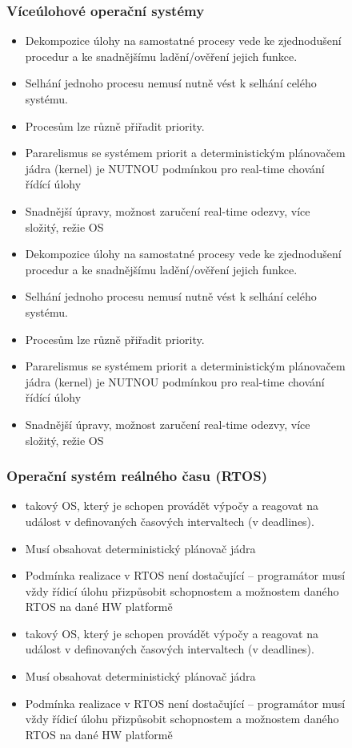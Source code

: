 \begin{figure}[h]
\subsubsection*{Víceúlohové operační systémy}
\begin{itemize}
  \item Dekompozice úlohy na samostatné procesy vede ke zjednodušení procedur a ke snadnějšímu ladění/ověření jejich funkce.
  \item Selhání jednoho procesu nemusí nutně vést k selhání celého systému.
  \item Procesům lze různě přiřadit priority.
  \item Pararelismus se systémem priorit a deterministickým plánovačem jádra (kernel) je NUTNOU podmínkou pro real-time chování řídící úlohy
  \item Snadnější úpravy, možnost zaručení real-time odezvy, více složitý, režie OS
    \item Dekompozice úlohy na samostatné procesy vede ke zjednodušení procedur a ke snadnějšímu ladění/ověření jejich funkce.
    \item Selhání jednoho procesu nemusí nutně vést k selhání celého systému.
    \item Procesům lze různě přiřadit priority.
    \item Pararelismus se systémem priorit a deterministickým plánovačem jádra (kernel) je NUTNOU podmínkou pro real-time chování řídící úlohy
    \item Snadnější úpravy, možnost zaručení real-time odezvy, více složitý, režie OS
\end{itemize}

\subsubsection*{Operační systém reálného času (RTOS)}
\begin{itemize}
  \item takový OS, který je schopen provádět výpočy a reagovat na událost v definovaných časových intervaltech (v deadlines).
  \item Musí obsahovat deterministický plánovač jádra
  \item Podmínka realizace v RTOS není dostačující – programátor musí vždy řídicí úlohu přizpůsobit schopnostem a možnostem daného RTOS na dané HW platformě
    \item takový OS, který je schopen provádět výpočy a reagovat na událost v definovaných časových intervaltech (v deadlines).
    \item Musí obsahovat deterministický plánovač jádra
    \item Podmínka realizace v RTOS není dostačující – programátor musí vždy řídicí úlohu přizpůsobit schopnostem a možnostem daného RTOS na dané HW platformě
\end{itemize}


\end{figure}
